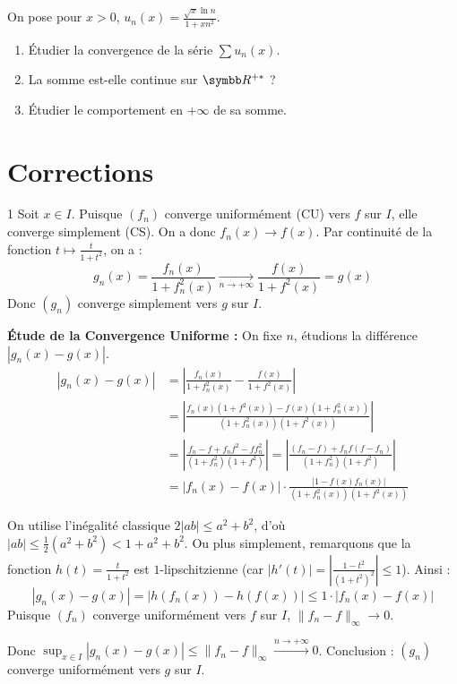 \begin{exercice}
On pose pour $x>0$, $u_n(x) = \frac{\sqrt{x} \ln n}{1+x n^2}$.
\begin{enumerate}
    \item Étudier la convergence de la série $\sum u_n(x)$.
    \item La somme est-elle continue sur $\R^{+*}$ ?
    \item Étudier le comportement en $+\infty$ de sa somme.
\end{enumerate}
\end{exercice}

\newpage
\section{Corrections}

\begin{correction}{1}
Soit $x \in I$. Puisque $(f_n)$ converge uniformément (CU) vers $f$ sur $I$, elle converge simplement (CS).
On a donc $f_n(x) \to f(x)$.
Par continuité de la fonction $t \mapsto \frac{t}{1+t^2}$, on a :
\[g_n(x) = \frac{f_n(x)}{1+f_n^2(x)} \xrightarrow[n\to+\infty]{} \frac{f(x)}{1+f^2(x)} = g(x)\]
Donc $(g_n)$ converge simplement vers $g$ sur $I$.

\textbf{Étude de la Convergence Uniforme :}
On fixe $n$,
étudions la différence $|g_n(x) - g(x)|$.
\begin{align*}
    |g_n(x) - g(x)| &= \left| \frac{f_n(x)}{1+f_n^2(x)} - \frac{f(x)}{1+f^2(x)} \right| \\
    &= \left| \frac{f_n(x)(1+f^2(x)) - f(x)(1+f_n^2(x))}{(1+f_n^2(x))(1+f^2(x))} \right| \\
    &= \left| \frac{f_n - f + f_n f^2 - f f_n^2}{(1+f_n^2)(1+f^2)} \right| = \left| \frac{(f_n - f) + f_n f (f - f_n)}{(1+f_n^2)(1+f^2)} \right| \\
    &= |f_n(x) - f(x)| \cdot \frac{|1 - f(x)f_n(x)|}{(1+f_n^2(x))(1+f^2(x))}
\end{align*}

On utilise l'inégalité classique $2|ab| \leqslant a^2 + b^2$, d'où $|ab| \leqslant \frac{1}{2}(a^2+b^2) < 1+a^2+b^2$. Ou plus simplement, remarquons que la fonction $h(t) = \frac{t}{1+t^2}$ est $1$-lipschitzienne (car $|h'(t)| = \left|\frac{1-t^2}{(1+t^2)^2}\right| \leqslant 1$).
Ainsi :
\[|g_n(x) - g(x)| = |h(f_n(x)) - h(f(x))| \leqslant 1 \cdot |f_n(x) - f(x)|\]
Puisque $(f_n)$ converge uniformément vers $f$ sur $I$, $\|f_n - f\|_\infty \to 0$.

Donc $\sup_{x \in I} |g_n(x) - g(x)| \leqslant \|f_n - f\|_\infty \xrightarrow{n\to+\infty} 0$.
Conclusion : $(g_n)$ converge uniformément vers $g$ sur $I$.
\end{correction}


